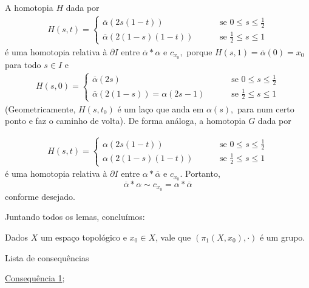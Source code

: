 \begin{dem}
    A homotopia $H$ dada por 
    \begin{align*}
        H(s,t)=\begin{cases}
            \overline{\alpha}(2s(1-t))\qquad &\mbox{ se }0\le s \le \frac{1}{2}\\
            \overline{\alpha}(2(1-s)(1-t)) \qquad &\mbox{ se }\frac{1}{2}\le s\le 1 
        \end{cases}
    \end{align*}
    é uma homotopia relativa à $\partial I$ entre $\overline{\alpha}*\alpha$ e $c_{x_0},$ porque $H(s,1)=\overline{\alpha}(0)=x_0$ para todo $s\in I$ e 
    \begin{align*}
        H(s,0)=\begin{cases}
            \overline{\alpha}(2s)\qquad &\mbox{ se }0\le s \le \frac{1}{2}\\
            \overline{\alpha}(2(1-s))=\alpha(2s-1) \qquad &\mbox{ se }\frac{1}{2}\le s\le 1
        \end{cases}
    \end{align*}
    (Geometricamente, $H(s,t_0)$ é um laço que anda em $\alpha(s),$ para num certo ponto e faz o caminho de volta).
    De forma análoga, a homotopia $G$ dada por 
   
\begin{align*}
        H(s,t)=\begin{cases}
            \alpha(2s(1-t))\qquad &\mbox{ se }0\le s \le \frac{1}{2} \\
            \alpha(2(1-s)(1-t)) \qquad &\mbox{ se }\frac{1}{2}\le s\le 1 
        \end{cases}
    \end{align*}
    é uma homotopia relativa à $\partial I$ entre $\alpha*\overline{\alpha}$ e $c_{x_0}.$ Portanto, $$\overline{\alpha}*\alpha\sim c_{x_0}=\alpha*\overline{\alpha}$$ conforme desejado.
\end{dem}

Juntando todos os lemas, concluímos: 

\begin{thm}
    Dados $X$ um espaço topológico e $x_0\in X$, vale que $(\pi_1(X,x_0),\cdot)$ é um grupo.
\end{thm}

\begin{titlemize}{Lista de consequências}
	\item \hyperref[grupo-fundamental-def]{Consequência 1};\\ %
\end{titlemize}
